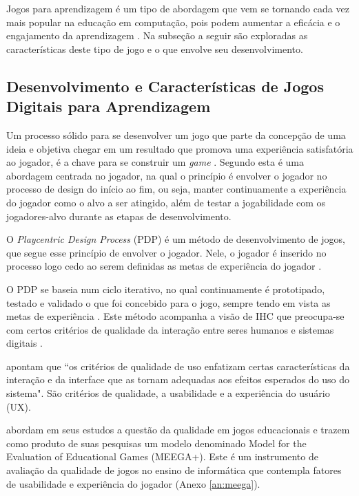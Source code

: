 Jogos para aprendizagem é um tipo de abordagem que vem se tornando cada vez mais popular na educação em computação, pois podem aumentar a eficácia e o engajamento da aprendizagem \cite{battistella, brito, sales_climaco2016, queiroz}. Na subseção a seguir são exploradas as características deste tipo de jogo e o que envolve seu desenvolvimento.

\subsection{Desenvolvimento e Características de Jogos Digitais para Aprendizagem}

Um processo sólido para se desenvolver um jogo que parte da concepção de uma ideia e objetiva chegar em um resultado que promova uma experiência satisfatória ao jogador, é a chave para se construir um \textit{game} \cite[p. 10-11]{Fullerton_2008}.  Segundo  esta é uma abordagem centrada no jogador, na qual o princípio é envolver o jogador no processo de design do início ao fim, ou seja, manter continuamente a experiência do jogador como o alvo a ser atingido, além de testar a jogabilidade com os jogadores-alvo durante as etapas de desenvolvimento.

O \textit{Playcentric Design Process} (PDP) é um método de desenvolvimento de jogos, que segue esse princípio de envolver o jogador. Nele, o jogador é inserido no processo logo cedo ao serem definidas as metas de experiência do jogador \cite{Fullerton_2008}.

O PDP se baseia num ciclo iterativo, no qual continuamente é prototipado, testado e validado o que foi concebido para o jogo, sempre tendo em vista as metas de experiência \cite[p. 10-11]{Fullerton_2008}. Este método acompanha a visão de IHC que preocupa-se com certos critérios de qualidade da interação entre seres humanos e sistemas digitais \cite[p. 8-10]{BarbosaEtAl2021}.

 apontam que ``os critérios de qualidade de uso enfatizam certas características da interação e da interface que as tornam adequadas aos efeitos esperados do uso do sistema". São critérios de qualidade, a usabilidade e a experiência do usuário (UX).

 abordam em seus estudos a questão da qualidade em jogos educacionais e trazem como produto de suas pesquisas um modelo denominado Model for the Evaluation of Educational Games (MEEGA+). Este é um instrumento de avaliação da qualidade de jogos no ensino de informática que contempla fatores de usabilidade e experiência do jogador (Anexo \ref{an:meega}).

